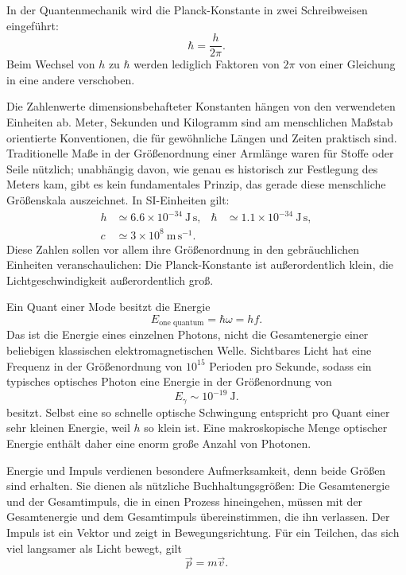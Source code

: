 In der Quantenmechanik wird die Planck-Konstante in zwei Schreibweisen eingeführt:
\begin{equation}
\hbar=\frac{h}{2\pi}.
\end{equation}
Beim Wechsel von \(h\) zu \(\hbar\) werden lediglich Faktoren von \(2\pi\) von einer Gleichung in eine andere verschoben.

Die Zahlenwerte dimensionsbehafteter Konstanten hängen von den verwendeten Einheiten ab. Meter, Sekunden und Kilogramm sind am menschlichen Maßstab orientierte Konventionen, die für gewöhnliche Längen und Zeiten praktisch sind. Traditionelle Maße in der Größenordnung einer Armlänge waren für Stoffe oder Seile nützlich; unabhängig davon, wie genau es historisch zur Festlegung des Meters kam, gibt es kein fundamentales Prinzip, das gerade diese menschliche Größenskala auszeichnet. In SI-Einheiten gilt:
\begin{equation}
\begin{aligned}
h &\simeq 6.6\times10^{-34}\ \mathrm{J\,s},
&\hbar &\simeq 1.1\times10^{-34}\ \mathrm{J\,s},\\
c &\simeq 3\times10^8\ \mathrm{m\,s^{-1}}.
\end{aligned}
\end{equation}
Diese Zahlen sollen vor allem ihre Größenordnung in den gebräuchlichen Einheiten veranschaulichen: Die Planck-Konstante ist außerordentlich klein, die Lichtgeschwindigkeit außerordentlich groß.

Ein Quant einer Mode besitzt die Energie
\begin{equation}
E_{\text{one quantum}}=\hbar\omega=hf.
\end{equation}
Das ist die Energie eines einzelnen Photons, nicht die Gesamtenergie einer beliebigen klassischen elektromagnetischen Welle. Sichtbares Licht hat eine Frequenz in der Größenordnung von \(10^{15}\) Perioden pro Sekunde, sodass ein typisches optisches Photon eine Energie in der Größenordnung von
\begin{equation}
E_\gamma\sim 10^{-19}\ \mathrm{J}.
\end{equation}
besitzt. Selbst eine so schnelle optische Schwingung entspricht pro Quant einer sehr kleinen Energie, weil \(h\) so klein ist. Eine makroskopische Menge optischer Energie enthält daher eine enorm große Anzahl von Photonen.

Energie und Impuls verdienen besondere Aufmerksamkeit, denn beide Größen sind erhalten. Sie dienen als nützliche Buchhaltungsgrößen: Die Gesamtenergie und der Gesamtimpuls, die in einen Prozess hineingehen, müssen mit der Gesamtenergie und dem Gesamtimpuls übereinstimmen, die ihn verlassen. Der Impuls ist ein Vektor und zeigt in Bewegungsrichtung. Für ein Teilchen, das sich viel langsamer als Licht bewegt, gilt
\begin{equation}
\vec p=m\vec v.
\end{equation}


